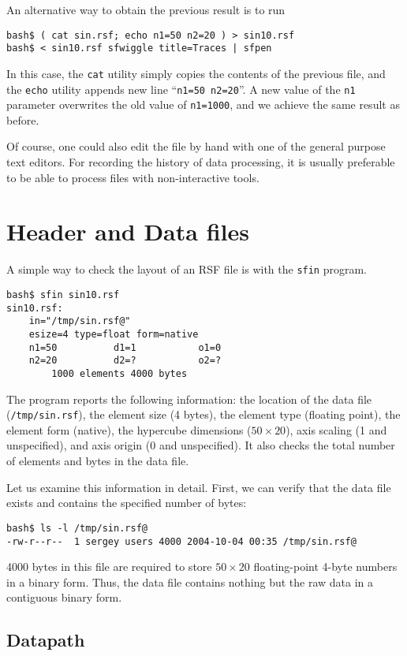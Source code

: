 An alternative way to obtain the previous result is to run
\begin{verbatim}
bash$ ( cat sin.rsf; echo n1=50 n2=20 ) > sin10.rsf 
bash$ < sin10.rsf sfwiggle title=Traces | sfpen
\end{verbatim}
In this case, the \texttt{cat} utility simply copies the contents of the
previous file, and the \texttt{echo} utility appends new line ``\texttt{n1=50
  n2=20}''. A new value of the \texttt{n1} parameter overwrites the old value
of \texttt{n1=1000}, and we achieve the same result as before.

Of course, one could also edit the file by hand with one of the general
purpose text editors. For recording the history of data processing, it is
usually preferable to be able to process files with non-interactive tools.

\section{Header and Data files}

A simple way to check the layout of an RSF file is with the \texttt{sfin}
program.
\begin{verbatim}
bash$ sfin sin10.rsf
sin10.rsf:
    in="/tmp/sin.rsf@"
    esize=4 type=float form=native
    n1=50          d1=1           o1=0
    n2=20          d2=?           o2=?
        1000 elements 4000 bytes
\end{verbatim}
The program reports the following information: the location of the data file
(\texttt{/tmp/sin.rsf\@}), the element size (4 bytes), the element
type (floating point), the element form (native), the hypercube dimensions
($50 \times 20$), axis scaling (1 and unspecified), and axis origin (0 and
unspecified). It also checks the total number of elements and bytes in the
data file.

Let us examine this information in detail. First, we can verify that the data
file exists and contains the specified number of bytes:
\begin{verbatim}
bash$ ls -l /tmp/sin.rsf@
-rw-r--r--  1 sergey users 4000 2004-10-04 00:35 /tmp/sin.rsf@
\end{verbatim}
4000 bytes in this file are required to store $50 \times 20$ floating-point
4-byte numbers in a binary form. Thus, the data file contains nothing but the
raw data in a contiguous binary form.

\subsection{Datapath}

